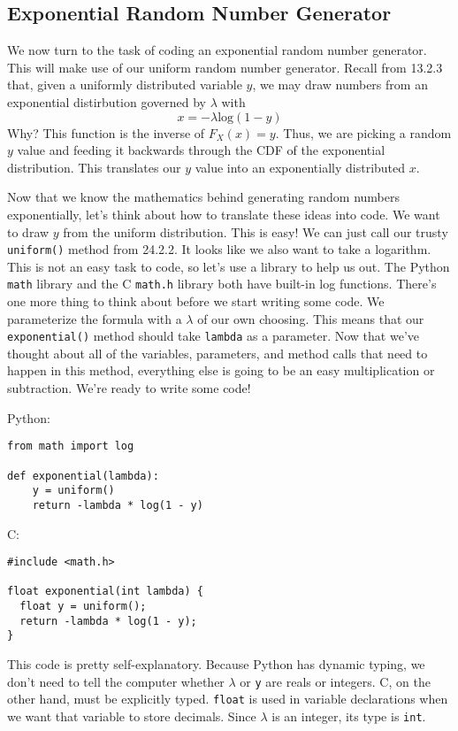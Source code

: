 \documentclass[a4paper]{article}
\begin{document}
\subsection{Exponential Random Number Generator}
We now turn to the task of coding an exponential random number generator. This will make use of our uniform random number generator. Recall from 13.2.3 that, given a uniformly distributed variable $y$, we may draw numbers from an exponential distirbution governed by $\lambda$ with
\[x = -\lambda \textrm{log}(1-y)\]
Why? This function is the inverse of $F_X(x) = y$. Thus, we are picking a random $y$ value and feeding it backwards through the CDF of the exponential distribution. This translates our $y$ value into an exponentially distributed $x$.

Now that we know the mathematics behind generating random numbers exponentially, let's think about how to translate these ideas into code. We want to draw $y$ from the uniform distribution. This is easy! We can just call our trusty \texttt{uniform()} method from 24.2.2. It looks like we also want to take a logarithm. This is not an easy task to code, so let's use a library to help us out. The Python \texttt{math} library and the C \texttt{math.h} library both have built-in log functions. There's one more thing to think about before we start writing some code. We parameterize the formula with a $\lambda$ of our own choosing. This means that our \texttt{exponential()} method should take \texttt{lambda} as a parameter. Now that we've thought about all of the variables, parameters, and method calls that need to happen in this method, everything else is going to be an easy multiplication or subtraction. We're ready to write some code!

Python:
\begin{verbatim}
from math import log

def exponential(lambda):
    y = uniform()
    return -lambda * log(1 - y)

\end{verbatim}


C:
\begin{verbatim}
#include <math.h>

float exponential(int lambda) {
  float y = uniform();
  return -lambda * log(1 - y);
}
\end{verbatim}

This code is pretty self-explanatory. Because Python has dynamic typing, we don't need to tell the computer whether $\lambda$ or \texttt{y} are reals or integers. C, on the other hand, must be explicitly typed. \texttt{float} is used in variable declarations when we want that variable to store decimals. Since $\lambda$ is an integer, its type is \texttt{int}.
\end{document}
